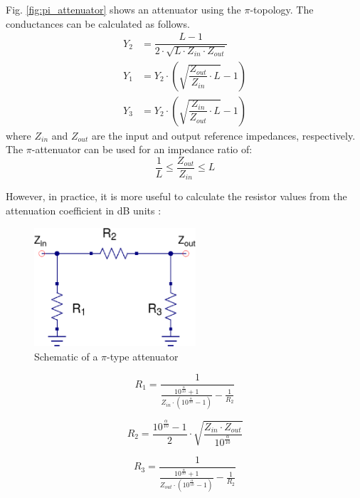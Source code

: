 Fig. \ref{fig:pi_attenuator} shows an attenuator using the
$\pi$-topology. The conductances can be calculated as follows.
\begin{align}
Y_2 & = \dfrac{L - 1}{2\cdot \sqrt{L\cdot Z_{in}\cdot Z_{out}}} \\
Y_1 & = Y_2\cdot\left( \sqrt{\dfrac{Z_{out}}{Z_{in}}\cdot L} - 1 \right) \\
Y_3 & = Y_2\cdot\left( \sqrt{\dfrac{Z_{in}}{Z_{out}}\cdot L} - 1 \right)
\end{align}
where $Z_{in}$ and $Z_{out}$ are the input and output reference
impedances, respectively. The $\pi$-attenuator can be used for an
impedance ratio of:
\begin{equation}
\dfrac{1}{L} \le \dfrac{Z_{out}}{Z_{in}} \le L
\end{equation}

\noindent However, in practice, it is more useful to calculate the resistor values from the attenuation coefficient in dB units \cite{Vizmuller}:

\begin{figure}[ht]
\begin{center}
\includegraphics[width=6cm]{bitmaps/synthesis/attenuators/Pi-Attenuator-Schematic.eps}
\end{center}
\caption{Schematic of a $\pi$-type attenuator}
\label{fig:pi_attenuator_schematic}
\end{figure}


\begin{equation}
 R_{1} = \frac{1}{\frac{10^{\frac{\alpha}{10}}+1}{Z_{in} \cdot (10^{\frac{\alpha}{10}}-1)} - \frac{1}{R_{2}}}
\end{equation}

\begin{equation}
 R_{2} = \frac{10^{\frac{\alpha}{10}}-1}{2} \cdot \sqrt{\frac{Z_{in}\cdot Z_{out}}{10^{\frac{\alpha}{10}}}}	
\end{equation}

\begin{equation}
 R_{3} = \frac{1}{\frac{10^{\frac{\alpha}{10}}+1}{Z_{out} \cdot (10^{\frac{\alpha}{10}}-1)} - \frac{1}{R_{2}}}
\end{equation}


